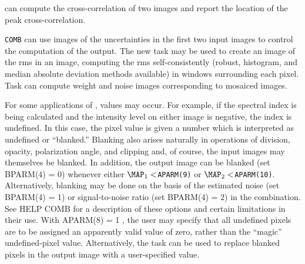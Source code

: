 
{\tt {}} can compute the cross-correlation of two images and
report the location of the peak cross-correlation.

{}

     {\tt COMB} can use images of the uncertainties in the first two
input images to control the computation of the output.  The new task
{\tt {}} may be used to create an image of the rms in an
image, computing the rms self-consistently (robust, histogram, and
median absolute deviation methods available) in windows surrounding
each pixel.  Task {\tt {}} can compute weight and noise
images corresponding to mosaiced images.

     For some applications of {\tt {}},  values may occur.  For example, if the spectral index is being
calculated and the intensity level on either image is negative, the
index is undefined. In this case, the pixel value is given a number
which is interpreted as undefined or ``blanked.''  Blanking also
arises naturally in operations of division, opacity, polarization
angle, and clipping and, of course, the input images may themselves be
blanked.  In addition, the output image can be blanked (set {\us
BPARM(4) = 0}) whenever either ${\MAP}_1 < ${\tt APARM(9)} or
${\MAP}_2 < ${\tt APARM(10)}. Alternatively, blanking may be done on
the basis of the estimated noise (set {\us BPARM(4) = 1}) or
signal-to-noise ratio (set {\us BPARM(4) = 2}) in the combination.
See {\us HELP COMB \CR} for a description of these options and certain
limitations in their use. With {\us APARM(8) = 1 \CR}, the user may
specify that all undefined pixels are to be assigned an apparently
valid value of zero, rather than the ``magic'' undefined-pixel value.
Alternatively,  the task {\tt {}} can be used to replace
blanked pixels in the output image with a user-specified value.

